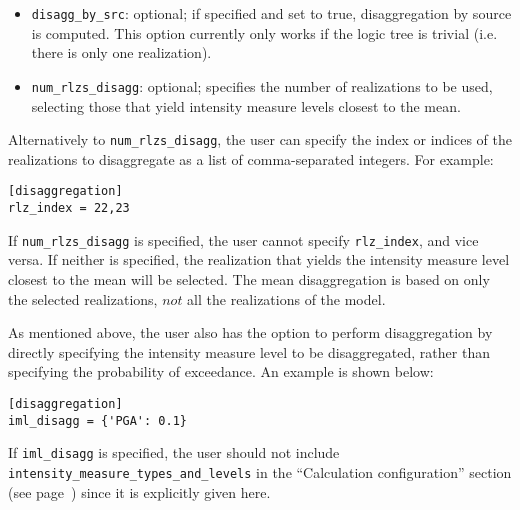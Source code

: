 \begin{itemize}
    \item \Verb+disagg_by_src+: optional; if specified and set to true,
	    disaggregation by source is computed. This option currently only
		works if the logic tree is trivial (i.e. there is only one
		realization).

    \item \Verb+num_rlzs_disagg+: optional; specifies the number of realizations
	    to be used, selecting those that yield intensity measure levels
		closest to the mean.  

\end{itemize}

Alternatively to \texttt{num\_rlzs\_disagg}, the user can specify the index or
indices of the realizations to disaggregate as a list of comma-separated
integers. For example:

\begin{verbatim}
[disaggregation]
rlz_index = 22,23
\end{verbatim}

If \texttt{num\_rlzs\_disagg} is specified, the user cannot specify
\texttt{rlz\_index}, and vice versa. If neither is specified, the
realization that yields the intensity measure level closest to the mean will be
selected. The mean disaggregation is based on only the selected realizations,
$not$ all the realizations of the model.  

As mentioned above, the user also has the option to perform disaggregation by
directly specifying the intensity measure level to be disaggregated, rather than
specifying the probability of exceedance. An example is shown below:

\begin{verbatim}
[disaggregation]
iml_disagg = {'PGA': 0.1}
\end{verbatim}

If \texttt{iml\_disagg} is specified, the user should not include
\texttt{intensity\_measure\_types\_and\_levels} in the ``Calculation
configuration'' section (see page~\pageref{sec:calculation_configuration}) since
it is explicitly given here.
